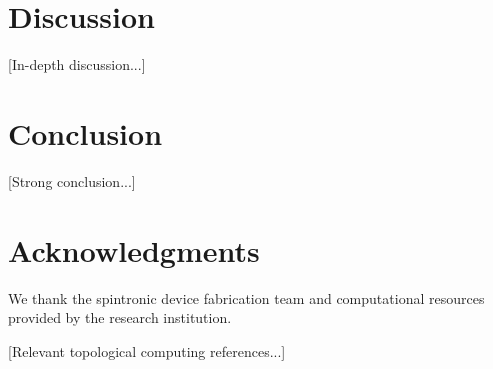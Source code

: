\documentclass[two_column,11pt]{article}
\begin{document}
\section{Discussion}
[In-depth discussion...]

\section{Conclusion}
[Strong conclusion...]

\section{Acknowledgments}
We thank the spintronic device fabrication team and computational resources provided by the research institution.


\begin{thebibliography}{99}
 [Relevant topological computing references...]

\end{thebibliography}
\end{document}
